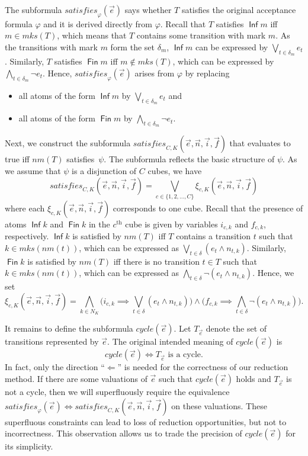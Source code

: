 \documentclass[a4paper,UKenglish,cleveref,autoref,thm-restate]{lipics-v2021}
\DeclareMathOperator{\Inf}{\mathsf{Inf}}
\DeclareMathOperator{\Fin}{\mathsf{Fin}}
\newcommand{\mks}{\mathit{mks}}
\newcommand{\rem}{\mathit{nm}}
\newcommand{\mcycle}{\mathit{cycle}}
\newcommand{\msat}{\mathit{satisfies}}
\newcommand{\Te}{T_{\vec{e}}}
\begin{document}
The subformula $\msat_\varphi(\vec{e})$ says whether $T$ satisfies the
original acceptance formula $\varphi$ and it is derived directly from
$\varphi$. Recall that $T$ satisfies $\Inf m$ iff $m\in\mks(T)$, which
means that $T$ contains some transition with mark $m$. As the
transitions with mark $m$ form the set $\delta_m$, $\Inf m$ can be
expressed by $\bigvee_{t\in\delta_m}e_t$. Similarly, $T$ satisfies
$\Fin m$ iff $m\not\in\mks(T)$, which can be expressed by
$\bigwedge_{t\in\delta_m}\neg e_t$. Hence, $\msat_\varphi(\vec{e})$
arises from $\varphi$ by replacing
\begin{itemize}
\item all atoms of the form $\Inf m$ by $\bigvee_{t\in\delta_m}e_t$ and
\item all atoms of the form $\Fin m$ by $\bigwedge_{t\in\delta_m}\neg e_t$.
\end{itemize}

Next, we construct the subformula
$\msat_{C,K}(\vec{e},\vec{n},\vec{i},\vec{f})$ that evaluates to true
iff $\rem(T)$ satisfies~$\psi$. The subformula reflects the basic
structure of $\psi$. As we assume that $\psi$ is a disjunction of $C$
cubes, we have
\[
  \msat_{C,K}(\vec{e},\vec{n},\vec{i},\vec{f})=\bigvee_{c\in\{1,2,\ldots,C\}}\xi_{c,K}(\vec{e},\vec{n},\vec{i},\vec{f})
\]
where each $\xi_{c,K}(\vec{e},\vec{n},\vec{i},\vec{f})$ corresponds to
one cube. Recall that the presence of atoms $\Inf k$ and $\Fin k$ in
the $c^\textrm{th}$ cube is given by variables $i_{c,k}$ and
$f_{c,k}$, respectively. $\Inf k$ is satisfied by $\rem(T)$ iff $T$
contains a transition $t$ such that $k\in\mks(\rem(t))$, which can be
expressed as $\bigvee_{t\in\delta}(e_t\wedge n_{t,k})$. Similarly,
$\Fin k$ is satisfied by $\rem(T)$ iff there is no transition $t\in T$
such that $k\in\mks(\rem(t))$, which can be expressed as
$\bigwedge_{t\in\delta}\neg(e_t\wedge n_{t,k})$. Hence, we set
\[
  \xi_{c,K}(\vec{e},\vec{n},\vec{i},\vec{f})=
  \bigwedge_{k\in N_K}\Big(i_{c,k}\implies\bigvee_{t\in\delta}(e_t\wedge n_{t,k})\Big)\wedge\Big(f_{c,k}\implies\bigwedge_{t\in\delta}\neg(e_t\wedge n_{t,k})\Big).
\]

It remains to define the subformula $\mcycle(\vec{e})$. Let $\Te$
denote the set of transitions represented by $\vec{e}$. The original
intended meaning of $\mcycle(\vec{e})$ is
\[
  \mcycle(\vec{e}) \iff \Te\textrm{ is a cycle}.
\]
In fact, only the direction ``$\Longleftarrow$'' is needed for the
correctness of our reduction method. If there are some valuations of
$\vec{e}$ such that $\mcycle(\vec{e})$ holds and $\Te$ is not a cycle,
then we will superfluously require the equivalence
$\msat_\varphi(\vec{e}) \iff
\msat_{C,K}(\vec{e},\vec{n},\vec{i},\vec{f})$ on these valuations.
These superfluous constraints can lead to loss of reduction
opportunities, but not to incorrectness. This observation allows us to
trade the precision of $\mcycle(\vec{e})$ for its simplicity.
\end{document}
